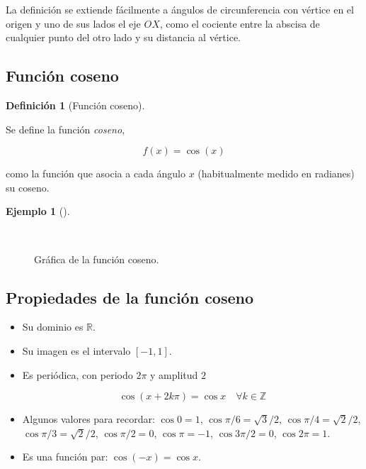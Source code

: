 \documentclass[
  a4paper,
]{scrreport}
\theoremstyle{plain}
\theoremstyle{plain}
\theoremstyle{definition}
\newtheorem{definition}{Definición}[chapter]
\theoremstyle{definition}
\newtheorem{example}{Ejemplo}[chapter]
\theoremstyle{plain}
\theoremstyle{remark}
\begin{document}
La definición se extiende fácilmente a ángulos de circunferencia con
vértice en el origen y uno de sus lados el eje \(OX\), como el cociente
entre la abscisa de cualquier punto del otro lado y su distancia al
vértice.

\hypertarget{funciuxf3n-coseno}{%
\subsection{Función coseno}\label{funciuxf3n-coseno}}

\leavevmode{}%
\begin{definition}[Función coseno]\label{def-funcion-coseno}

Se define la función \emph{coseno},

\[f(x)=\cos(x)\]

como la función que asocia a cada ángulo \(x\) (habitualmente medido en
radianes) su coseno.

\end{definition}

\leavevmode{}%
\begin{example}[]\label{exm-grafica-funcion-coseno}

~

\begin{figure}

{\centering 



}

\caption{Gráfica de la función coseno.}

\end{figure}

\end{example}

\hypertarget{propiedades-de-la-funciuxf3n-coseno}{%
\subsection{Propiedades de la función
coseno}\label{propiedades-de-la-funciuxf3n-coseno}}

\begin{itemize}
\item
  Su dominio es \(\mathbb{R}\).
\item
  Su imagen es el intervalo \([-1,1]\).
\item
  Es periódica, con periodo \(2\pi\) y amplitud \(2\)

  \[\cos (x+2k\pi)= \cos x\quad \forall k\in \mathbb{Z}\]
\item
  Algunos valores para recordar: \(\cos 0=1\),
  \(\cos \pi/6= \sqrt{3}/2\), \(\cos \pi/4=\sqrt{2}/2\),
  \(\cos \pi/3= \sqrt{2}/2\), \(\cos \pi/2 =0\), \(\cos \pi = -1\),
  \(\cos 3\pi/2=0\), \(\cos 2\pi=1\).
\item
  Es una función par: \(\cos(-x)=\cos x\).
\end{itemize}
\end{document}
